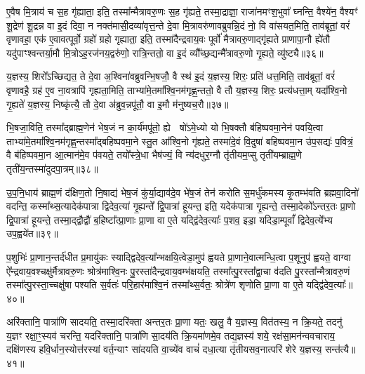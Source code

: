 ए॒वैष मि॒त्राय॑ च स॒ह गृ॑ह्याता॒ इति॒ तस्मा᳚न्मैत्रावरु॒णः स॒ह गृ॑ह्यते॒ तस्मा॒द्राज्ञा॒ राजा॑नमꣳश॒भुवा᳚ घ्नन्ति॒ वैश्ये॑न॒ वैश्यꣳ॑ शू॒द्रेण॑ शू॒द्रन्न वा इ॒दं दिवा॒ न नक्त॑मासी॒दव्या॑वृत्त॒न्ते दे॒वा मि॒त्रावरु॑णावब्रुवन्नि॒दं नो॒ वि वा॑सयत॒मिति॒ ताव॑ब्रूतां॒ वरं॑ वृणावहा॒ एक॑ ए॒वावत्पूर्वो॒ ग्रहो॑ ग्रहो गृह्याता॒ इति॒ तस्मा॑दैन्द्रवाय॒वः पूर्वो॑ मैत्रावरु॒णाद्गृ॑ह्यते प्राणापा॒नौ ह्ये॑तौ यदु॑पाꣳश्वन्तर्या॒मौ मि॒त्रो\-ऽह॒रज॑नय॒द्वरु॑णो॒ रात्रि॒न्ततो॒ वा इ॒दं व्यौ᳚च्छ॒द्यन्मै᳚त्रावरु॒णो गृ॒ह्यते॒ व्यु॑ष्ट्यै॥३६॥

{\anuvakamend[{ए॒ष चै᳚न्द्रवाय॒वो द्वाविꣳ॑शतिश्च॥८॥}]}

य॒ज्ञस्य॒ शिरो᳚\-ऽच्छिद्यत॒ ते दे॒वा अ॒श्विना॑वब्रुवन्भि॒षजौ॒ वै स्थ॑ इ॒दं य॒ज्ञस्य॒ शिरः॒ प्रति॑ धत्त॒मिति॒ ताव॑ब्रूतां॒ वरं॑ वृणावहै॒ ग्रह॑ ए॒व ना॒वत्रापि॑ गृह्यता॒मिति॒ ताभ्या॑मे॒तमा᳚श्वि॒नम॑गृह्ण॒न्ततो॒ वै तौ य॒ज्ञस्य॒ शिरः॒ प्रत्य॑धत्ता॒म् यदा᳚श्वि॒नो गृ॒ह्यते॑ य॒ज्ञस्य॒ निष्कृ॑त्यै॒ तौ दे॒वा अ॑ब्रुव॒न्नपू॑तौ॒ वा इ॒मौ म॑नुष्यच॒रौ॥३७॥

भि॒षजा॒विति॒ तस्मा᳚द्ब्राह्म॒णेन॑ भेष॒जं न का॒र्य॑मपू॑तो॒ ह्ये  षो॑\-ऽमे॒ध्यो यो भि॒षक्तौ ब॑हिष्पवमा॒नेन॑ पवयि॒त्वा ताभ्या॑मे॒तमा᳚श्वि॒नम॑गृह्ण॒न्तस्मा᳚द्बहिष्पवमा॒ने स्तु॒त आ᳚श्वि॒नो गृ॑ह्यते॒ तस्मा॑दे॒वं वि॒दुषा॑ बहिष्पवमा॒न उ॑प॒सद्यः॑ प॒वित्रं॒ वै ब॑हिष्पवमा॒न आ॒त्मान॑मे॒व प॑वयते॒ तयो᳚स्त्रे॒धा भैष॑ज्यं॒ वि न्य॑दधुर॒ग्नौ तृ॑तीयम॒प्सु तृती॑यम्ब्राह्म॒णे तृती॑य॒न्तस्मा॑दुदपा॒त्रम्॥३८॥

उ॒प॒नि॒धाय॑ ब्राह्म॒णं द॑क्षिण॒तो नि॒षाद्य॑ भेष॒जं कु॑र्या॒द्याव॑दे॒व भे॑ष॒जं तेन॑ करोति स॒मर्धु॑कमस्य कृ॒तम्भ॑वति ब्रह्मवा॒दिनो॑ वदन्ति॒ कस्मा᳚थ्स॒त्यादेक॑पात्रा द्विदेव॒त्या॑ गृ॒ह्यन्ते᳚ द्वि॒पात्रा॑ हूयन्त॒ इति॒ यदेक॑पात्रा गृ॒ह्यन्ते॒ तस्मा॒देको᳚\-ऽन्तर॒तः प्रा॒णो द्वि॒पात्रा॑ हूयन्ते॒ तस्मा॒द्द्वौद्वौ॑ ब॒हिष्टा᳚त्प्रा॒णाः प्रा॒णा वा ए॒ते यद्द्वि॑देव॒त्याः᳚ प॒शव॒ इडा॒ यदिडा॒म्पूर्वां᳚ द्विदेव॒त्ये᳚भ्य उप॒ह्वये॑त॥३९॥

प॒शुभिः॑ प्रा॒णान॒न्तर्द॑धीत प्र॒मायु॑कः स्याद्द्विदेव॒त्या᳚न्भक्षयि॒त्वेडा॒मुप॑ ह्वयते प्रा॒णाने॒वात्मन्धि॒त्वा प॒शूनुप॑ ह्वयते॒ वाग्वा ऐ᳚न्द्रवाय॒वश्चक्षु॑र्मैत्रावरु॒णः श्रोत्र॑माश्वि॒नः पु॒रस्ता॑दैन्द्रवाय॒वम्भ॑क्षयति॒ तस्मा᳚त्पु॒रस्ता᳚द्वा॒चा व॑दति पु॒रस्ता᳚न्मैत्रावरु॒णं तस्मा᳚त्पु॒रस्ता॒च्चक्षु॑षा पश्यति स॒र्वतः॑ परि॒हार॑माश्वि॒नं तस्मा᳚थ्स॒र्वतः॒ श्रोत्रे॑ण शृणोति प्रा॒णा वा ए॒ते यद्द्वि॑देव॒त्याः᳚॥४०॥

अरि॑क्तानि॒ पात्रा॑णि सादयति॒ तस्मा॒दरि॑क्ता अन्तर॒तः प्रा॒णा यतः॒ खलु॒ वै य॒ज्ञस्य॒ वित॑तस्य॒ न क्रि॒यते॒ तदनु॑ य॒ज्ञꣳ रक्षा॒ꣳ॒स्यव॑ चरन्ति॒ यदरि॑क्तानि॒ पात्रा॑णि सा॒दय॑ति क्रि॒यमा॑णमे॒व तद्य॒ज्ञस्य॑ शये॒ रक्ष॑सा॒मन॑न्ववचाराय॒ दक्षि॑णस्य हवि॒र्धान॒स्योत्त॑रस्यां वर्त॒न्याꣳ सा॑दयति वा॒च्ये॑व वाचं॑ दधा॒त्या तृ॑तीयसव॒नात्परि॑ शेरे य॒ज्ञस्य॒ सन्त॑त्यै॥४१॥

